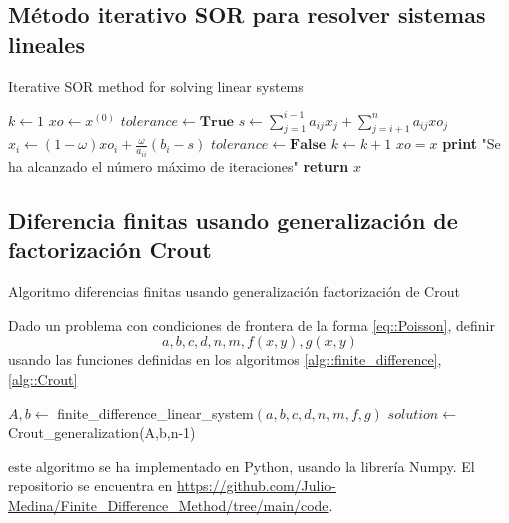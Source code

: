 \documentclass[a4paper]{article}
\begin{document}
\subsection{Método iterativo SOR para resolver sistemas lineales}
\begin{algorithm}[H]
\caption{Iterative SOR method for solving linear systems}\label{alg::SOR}
\begin{algorithmic}[H]
\State $k \gets 1$
\State $xo \gets x^{(0)}$
\State $tolerance\gets \textbf{True}$
\State $s \gets \sum_{j=1}^{i-1} a_{ij}x_j + \sum_{j=i+1}^{n} a_{ij}xo_j$
\State $x_i \gets (1-\omega) xo_i + \frac{\omega}{a_{ii}} (b_i - s)$
\EndFor
{}
\State $tolerance\gets \textbf{False}$
\EndIf
\State $k \gets k+1$
\State $xo=x$
\EndWhile
{}
\State \textbf{print} "Se ha alcanzado el número máximo de iteraciones"
\EndIf
\State \textbf{return} $x$
\EndFunction
\end{algorithmic}
\end{algorithm}

\subsection{Diferencia finitas usando generalización de factorización Crout}
\begin{algorithm}[H]
\caption{Algoritmo diferencias finitas usando generalización factorización de Crout}\label{alg::finite_diff_Crout}
Dado un problema con condiciones de frontera de la forma \ref{eq::Poisson}, definir
\begin{equation*}
a,b,c,d,n,m,f(x,y),g(x,y)
\end{equation*}
usando las funciones definidas en los algoritmos \ref{alg::finite_difference}, \ref{alg::Crout}
\begin{algorithmic}
\State $A, b\gets$ finite\_difference\_linear\_system$(a,b,c,d,n,m,f,g)$
\State $solution\gets $ Crout\_generalization(A,b,n-1)
\end{algorithmic}
\end{algorithm}
este algoritmo se ha implementado en Python, usando la librería Numpy. El repositorio se encuentra en \url{https://github.com/Julio-Medina/Finite_Difference_Method/tree/main/code}.
\end{document}
